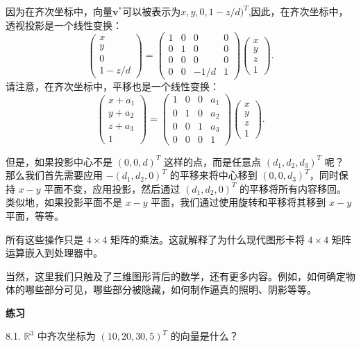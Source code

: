 因为在齐次坐标中，向量$\mathbf{v}^*$可以被表示为$x, y, 0, 1-z/d)^T$,因此，在齐次坐标中，透视投影是一个线性变换：
$$
\begin{pmatrix} x \\ y \\ 0 \\ 1 - z/d \end{pmatrix} = \begin{pmatrix} 1 & 0 & 0 & 0 \\ 0 & 1 & 0 & 0 \\ 0 & 0 & 0 & 0 \\ 0 & 0 & -1/d & 1 \end{pmatrix} \begin{pmatrix} x \\ y \\ z \\ 1 \end{pmatrix}.
$$
请注意，在齐次坐标中，平移也是一个线性变换：
$$
\begin{pmatrix} x + a_1 \\ y + a_2 \\ z + a_3 \\ 1 \end{pmatrix} = \begin{pmatrix} 1 & 0 & 0 & a_1 \\ 0 & 1 & 0 & a_2 \\ 0 & 0 & 1 & a_3 \\ 0 & 0 & 0 & 1 \end{pmatrix} \begin{pmatrix} x \\ y \\ z \\ 1 \end{pmatrix}.
$$

但是，如果投影中心不是 $(0, 0, d)^T$ 这样的点，而是任意点 $(d_1, d_2, d_3)^T$ 呢？
那么我们首先需要应用 $-( d_1 , d_2 , 0 )^T$ 的平移来将中心移到 $(0, 0, d_3)^T$，同时保持 $x-y$ 平面不变，应用投影，然后通过 $(d_1, d_2, 0)^T$ 的平移将所有内容移回。类似地，如果投影平面不是 $x-y$ 平面，我们通过使用旋转和平移将其移到 $x-y$ 平面，等等。

所有这些操作只是 $4 \times 4$ 矩阵的乘法。这就解释了为什么现代图形卡将 $4 \times 4$ 矩阵运算嵌入到处理器中。

当然，这里我们只触及了三维图形背后的数学，还有更多内容。例如，如何确定物体的哪些部分可见，哪些部分被隐藏，如何制作逼真的照明、阴影等等。


\textbf{练习}~

8.1. $\mathbb{R}^3$ 中齐次坐标为 $(10, 20, 30, 5)^T$ 的向量是什么？

